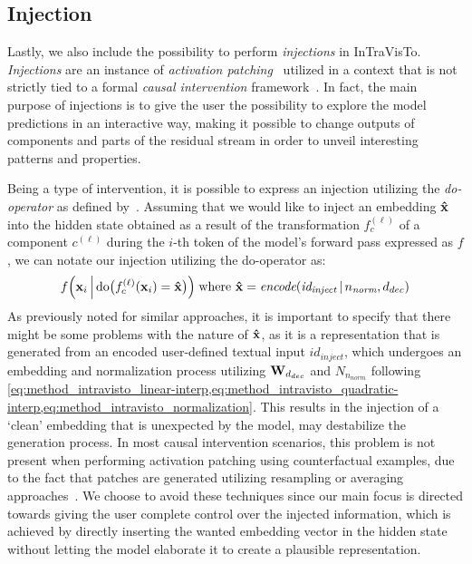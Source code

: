 \subsection{Injection}\label{ssec:method_intravisto_injection}

Lastly, we also include the possibility to perform \emph{injections} in InTraVisTo.
\emph{Injections} are an instance of \emph{activation patching}~\cite{olsson2022,meng2022,hanna2023,conmy2023,wang2023,mohebbi2023,zhang2024} utilized in a context that is not strictly tied to a formal \emph{causal intervention} framework~\cite{geiger2021,mcgrath2023}.
In fact, the main purpose of injections is to give the user the possibility to explore the model predictions in an interactive way, making it possible to change outputs of components and parts of the residual stream in order to unveil interesting patterns and properties.

Being a type of intervention, it is possible to express an injection utilizing the \emph{do-operator} as defined by~\citet{pearl2009}.
Assuming that we would like to inject an embedding $\bm{\mathbf{\hat x}}$ into the hidden state obtained as a result of the transformation $f_c^{(\ell)}$ of a component $c^{(\ell)}$ during the $i$-th token of the model's forward pass expressed as $f$, we can notate our injection utilizing the do-operator as:
\begin{equation}
    \label{eq:method_intravisto_injection}
    f\Bigl(\bm{\mathbf{x}}_i \, \Big| \, \text{do}\bigl(f_c^{(\ell)}(\bm{\mathbf{x}}_i) = \bm{\mathbf{\hat x}}\bigr)\Bigr)
    \; \text{where}\ \bm{\mathbf{\hat x}} = \textit{encode}(\textit{id}_{\textit{inject}} \,|\, n_\textit{norm}, d_{dec})
\end{equation}
As previously noted for similar approaches, it is important to specify that there might be some problems with the nature of $\bm{\mathbf{\hat x}}$, as it is a representation that is generated from an encoded user-defined textual input ${id}_{\textit{inject}}$, which undergoes an embedding and normalization process utilizing $\bm{\mathbf{W}}_{d_{dec}}$ and $N_{n_\textit{norm}}$ following \cref{eq:method_intravisto_linear-interp,eq:method_intravisto_quadratic-interp,eq:method_intravisto_normalization}.
This results in the injection of a `clean' embedding that is unexpected by the model,  may destabilize the generation process.
In most causal intervention scenarios, this problem is not present when performing activation patching using counterfactual examples, due to the fact that patches are generated utilizing resampling or averaging approaches~\cite{hanna2023,conmy2023,wang2023}.
We choose to avoid these techniques since our main focus is directed towards giving the user complete control over the injected information, which is achieved by directly inserting the wanted embedding vector in the hidden state without letting the model elaborate it to create a plausible representation.

